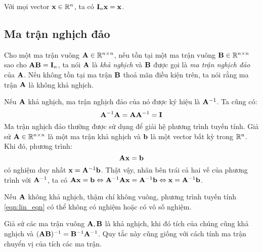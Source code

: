 Với mọi vector $\mathbf{x} \in \mathbb{R}^n$, ta có $\mathbf{I}_n \mathbf{x} = \mathbf{x}$.



\subsection{Ma trận nghịch đảo} %
\label{sub:inverse_matrix}

Cho một ma trận vuông $\mathbf{A} \in \mathbb{R}^{n\times n }$, nếu tồn tại một ma trận vuông
$\mathbf{B} \in \mathbb{R}^{n\times n}$ sao cho $\mathbf{A}\mathbf{B} = \mathbf{I}_n$, ta nói $\mathbf{A}$ là \textit{khả
nghịch} và $\mathbf{B}$ được gọi là \textit{ma trận nghịch đảo} của $\mathbf{A}$. Nếu không
tồn tại ma trận $\mathbf{B}$ thoả mãn điều kiện trên, ta nói rằng ma trận $\mathbf{A}$ là
{không khả nghịch}.

Nếu $\mathbf{A}$ khả nghịch, ma trận nghịch đảo của nó được ký hiệu là $\mathbf{A}^{-1}$. Ta
cũng có:
\begin{equation}
\mathbf{A}^{-1}\mathbf{A} = \mathbf{A}\mathbf{A}^{-1} = \mathbf{I}
\end{equation}
Ma trận nghịch đảo thường được sử dụng để giải hệ phương trình tuyến tính. Giả
sử $\mathbf{A} \in \mathbb{R}^{n\times n}$ là một ma trận khả nghịch và $\mathbf{b}$ là một vector bất kỳ trong $\mathbb{R}^n$. Khi đó, phương trình:
\begin{equation}
\label{eqn:lin_eqn}
\mathbf{A}\mathbf{x} = \mathbf{b}
\end{equation}
có nghiệm duy nhất $\mathbf{x} = \mathbf{A}^{-1}\mathbf{b}$. Thật vậy, nhân bên trái cả hai vế của
phương trình với $\mathbf{A}^{-1}$, ta có $\mathbf{A}\mathbf{x} = \mathbf{b} \Leftrightarrow  \mathbf{A}^{-1}\mathbf{A}\mathbf{x} = \mathbf{A}^{-1}\mathbf{b} \Leftrightarrow \mathbf{x} = \mathbf{A}^{-1}\mathbf{b}$.

Nếu $\mathbf{A}$ không khả nghịch, thậm chí không vuông, phương trình tuyến tính
\eqref{eqn:lin_eqn} có thể không có nghiệm hoặc có vô số nghiệm.

Giả sử các ma trận vuông $\mathbf{A}, \mathbf{B}$ là khả nghịch, khi đó tích của chúng cũng
khả nghịch và $(\mathbf{A}\mathbf{B})^{-1} = \mathbf{B}^{-1}\mathbf{A}^{-1}$. Quy tắc này cũng giống
với cách tính ma trận chuyển vị của tích các ma trận.


